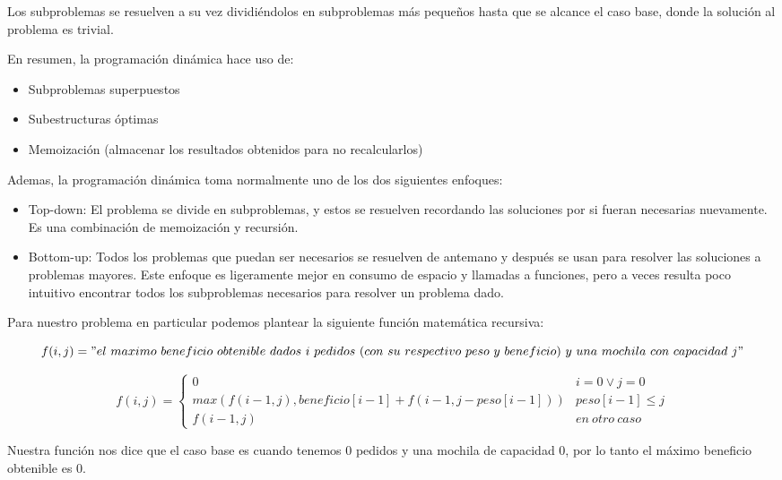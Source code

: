 Los subproblemas se resuelven a su vez dividiéndolos en subproblemas más pequeños hasta que se alcance el caso base, donde la solución al problema es trivial.


En resumen, la programación dinámica hace uso de:
\begin{itemize}
	\item Subproblemas superpuestos
	\item Subestructuras óptimas
	\item Memoización (almacenar los resultados obtenidos para no recalcularlos)
\end{itemize}


Ademas, la programación dinámica toma normalmente uno de los dos siguientes enfoques:
\begin{itemize}
	\item Top-down: El problema se divide en subproblemas, y estos se resuelven recordando las soluciones por si fueran necesarias nuevamente. Es una combinación de memoización y recursión.
	\item Bottom-up: Todos los problemas que puedan ser necesarios se resuelven de antemano y después se usan para resolver las soluciones a problemas mayores. Este enfoque es ligeramente mejor en consumo de espacio y llamadas a funciones, pero a veces resulta poco intuitivo encontrar todos los subproblemas necesarios para resolver un problema dado.
\end{itemize}


Para nuestro problema en particular podemos plantear la siguiente función matemática recursiva:

\begin{equation*}
f(i,j) = "el\ maximo\ beneficio\ obtenible\ dados\ i\ pedidos\ (con\ su\ respectivo\ peso\ y\ beneficio)\ y\ una\ mochila\ con\ capacidad\ j"
\end{equation*}

\begin{equation*}
	f(i,j) = \begin{cases} 
          0 & i = 0 \lor j = 0 \\
          max(f(i-1,j), beneficio[i-1] + f(i-1, j-peso[i-1])) & peso[i-1] \leq j \\
          f(i-1, j) & en\ otro\ caso
       \end{cases}
\end{equation*}

Nuestra función nos dice que el caso base es cuando tenemos 0 pedidos y una mochila de capacidad 0, por lo tanto el máximo beneficio obtenible es 0.

